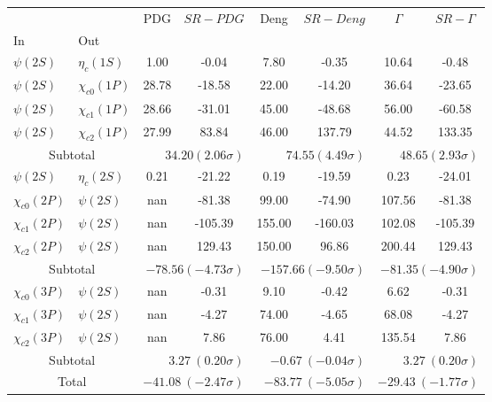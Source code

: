 \begin{tabular}{|l|l|c|c|c|c|c|c|}%
\hline%
&&PDG&$SR-PDG$&Deng&$SR-Deng$&$\Gamma$&$SR-\Gamma$\\%
In&Out&&&&&&\\%
\hline%
$\psi(2S)$&$\eta_{c}(1S)$&1.00&-0.04&7.80&-0.35&10.64&-0.48\\%
$\psi(2S)$&$\chi_{c0}(1P)$&28.78&-18.58&22.00&-14.20&36.64&-23.65\\%
$\psi(2S)$&$\chi_{c1}(1P)$&28.66&-31.01&45.00&-48.68&56.00&-60.58\\%
$\psi(2S)$&$\chi_{c2}(1P)$&27.99&83.84&46.00&137.79&44.52&133.35\\%
\hline%
\hline%
\multicolumn{2}{|c|}{Subtotal}&\multicolumn{2}{|r|}{$34.20 (2.06\sigma)$}&\multicolumn{2}{|r|}{$74.55 (4.49\sigma)$}&\multicolumn{2}{|r|}{$48.65 (2.93\sigma)$}\\%
\hline%
\hline%
$\psi(2S)$&$\eta_{c}(2S)$&0.21&-21.22&0.19&-19.59&0.23&-24.01\\%
$\chi_{c0}(2P)$&$\psi(2S)$&nan&-81.38&99.00&-74.90&107.56&-81.38\\%
$\chi_{c1}(2P)$&$\psi(2S)$&nan&-105.39&155.00&-160.03&102.08&-105.39\\%
$\chi_{c2}(2P)$&$\psi(2S)$&nan&129.43&150.00&96.86&200.44&129.43\\%
\hline%
\hline%
\multicolumn{2}{|c|}{Subtotal}&\multicolumn{2}{|r|}{$-78.56 (-4.73\sigma)$}&\multicolumn{2}{|r|}{$-157.66 (-9.50\sigma)$}&\multicolumn{2}{|r|}{$-81.35 (-4.90\sigma)$}\\%
\hline%
\hline%
$\chi_{c0}(3P)$&$\psi(2S)$&nan&-0.31&9.10&-0.42&6.62&-0.31\\%
$\chi_{c1}(3P)$&$\psi(2S)$&nan&-4.27&74.00&-4.65&68.08&-4.27\\%
$\chi_{c2}(3P)$&$\psi(2S)$&nan&7.86&76.00&4.41&135.54&7.86\\%
\hline%
\hline%
\multicolumn{2}{|c|}{Subtotal}&\multicolumn{2}{|r|}{$3.27~(0.20\sigma)$}&\multicolumn{2}{|r|}{$-0.67~(-0.04\sigma)$}&\multicolumn{2}{|r|}{$3.27~(0.20\sigma)$}\\%
\hline%
\hline%
\multicolumn{2}{|c|}{Total}&\multicolumn{2}{|r|}{$-41.08~(-2.47\sigma)$}&\multicolumn{2}{|r|}{$-83.77~(-5.05\sigma)$}&\multicolumn{2}{|r|}{$-29.43~(-1.77\sigma)$}\\%
\hline%
\end{tabular}